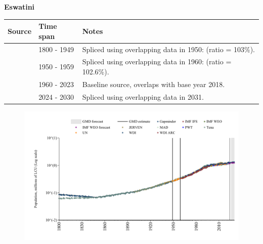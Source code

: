 \documentclass[12pt,a4paper,landscape]{article}
\begin{document}
\begin{adjustbox}{max totalsize={\paperwidth}{\paperheight},center}
\begin{minipage}[t][\textheight][t]{\textwidth}
\vspace*{0.5cm}
{}
\begin{center}
{\Large\bfseries Eswatini}
\end{center}
\vspace{0.5cm}
\begin{table}[H]
\centering
\small
\begin{tabular}{|l|l|l|}
\hline
\textbf{Source} & \textbf{Time span} & \textbf{Notes} \\
\hline
\rowcolor{white}\cite{Gapminder}& 1800 - 1949 &Spliced using overlapping data in 1950: (ratio = 103\%).\\
\rowcolor{lightgray}\cite{IMF_IFS}& 1950 - 1959 &Spliced using overlapping data in 1960: (ratio = 102.6\%).\\
\rowcolor{white}\cite{WDI}& 1960 - 2023 &Baseline source, overlaps with base year 2018.\\
\rowcolor{lightgray}\cite{Gapminder}& 2024 - 2030 &Spliced using overlapping data in 2031.\\
\hline
\end{tabular}
\end{table}
\begin{figure}[H]
\centering
\includegraphics[width=\textwidth,height=0.6\textheight,keepaspectratio]{graphs/SWZ_pop.pdf}
\end{figure}
\end{minipage}
\end{adjustbox}
\end{document}
